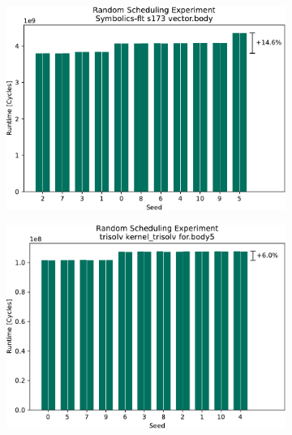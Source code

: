 \begin{figure}
    \begin{subfigure}{0.0325\textwidth}\caption{}\label{fig:eval:rndm:aarch64:a}\end{subfigure}
    \begin{subfigure}{0.44\textwidth}
        \includegraphics[width=\textwidth]{img/random-scheduling-experiment-pi-collected/Symbolics-flt-crop.pdf}
    \end{subfigure}
    \hfill
    \begin{subfigure}{0.0325\textwidth}\caption{}\label{fig:eval:rndm:aarch64:b}\end{subfigure}
    \begin{subfigure}{0.44\textwidth}
        \includegraphics[width=\textwidth]{img/random-scheduling-experiment-pi-collected/trisolv-crop.pdf}
    \end{subfigure}


\end{figure}
